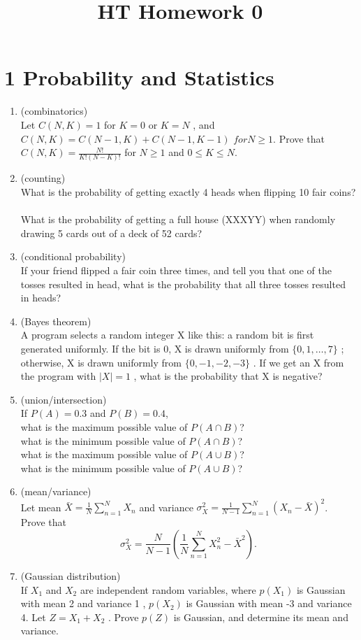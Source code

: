 \documentclass[12pt]{article}
\title{HT Homework 0}
\date{}
\theoremstyle{definition}
\begin{document}
\maketitle
\section*{1 Probability and Statistics}
\begin{enumerate}
\item (combinatorics) \\
Let  $C(N, K)=1$  for  $K=0$  or  $K=N$ , and  $C(N, K)=C(N-1, K)+C(N-1, K-1)$  $for  N \geq 1.$
Prove that $C(N, K)=\frac{N !}{K !(N-K) !}$  for  $N \geq 1$  and  $0 \leq K \leq N.$
\item (counting) \\
What is the probability of getting exactly 4 heads when flipping 10 fair coins?\\\\
What is the probability of getting a full house (XXXYY) when randomly drawing 5 cards out of a deck of 52 cards?
\item (conditional probability) \\
If your friend flipped a fair coin three times, and tell you that one of the tosses resulted in head, what
is the probability that all three tosses resulted in heads?
\item (Bayes theorem) \\
A program selects a random integer  X  like this: a random bit is first generated uniformly.
 If the bit is  0, X  is drawn uniformly from  $\{0,1, \ldots, 7\}$ ; otherwise,  X  is drawn uniformly from  $\{0,-1,-2,-3\}$ . If we get an  X  from the program with  $|X|=1$ , what is the probability that  X  is negative?
\item (union/intersection) \\
If  $P(A)=0.3$  and  $P(B)=0.4$,\\
what is the maximum possible value of  $P(A \cap B)$?\\
what is the minimum possible value of  $P(A \cap B)$?\\
what is the maximum possible value of  $P(A \cup B)$?\\
what is the minimum possible value of  $P(A \cup B)$?
\item (mean/variance) \\
Let mean  $\bar{X}=\frac{1}{N} \sum_{n=1}^{N} X_{n}$  and variance $\sigma_{X}^{2}=\frac{1}{N-1} \sum_{n=1}^{N}\left(X_{n}-\bar{X}\right)^{2}$.\\
Prove that\\
$$
\sigma_{X}^{2}=\frac{N}{N-1}\left(\frac{1}{N} \sum_{n=1}^{N} X_{n}^{2}-\bar{X}^{2}\right).
$$
\item (Gaussian distribution) \\
If  $X_{1}$  and  $X_{2}$  are independent random variables, where  $p\left(X_{1}\right)$  is Gaussian with mean 2 and variance 1 ,  $p\left(X_{2}\right)$  is Gaussian with mean -3 and variance 4. Let  $Z=X_{1}+X_{2}$ . Prove  $p(Z)$  is Gaussian, and determine its mean and variance.
\end{enumerate}
\end{document}
